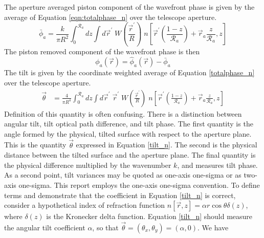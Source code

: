 The aperture averaged piston component of the wavefront phase is given by the average of
Equation \ref{eqn:totalphase_n} over the telescope aperture.
\begin{equation}\label{eqn:pistonphase_n}
\bar{\phi}_{a} = \frac{k}{\pi R^{2}} \int_{0}^{\mathcal{R}_{a}} dz 
\int d\vec{r}^{\prime} \; 
W \left( \frac{\vec{r}^{\prime}}{R} \right) \;
n
\left[\vec{r}^{\prime} \left( \frac{1-z}{\mathcal{R}_{a}} \right) + 
\vec{r}_{a} \frac{z}{\mathcal{R}_{a}}, z \right]
\end{equation}
The piston removed component of the wavefront phase is then
\begin{equation}\label{prphase_n}
\phi_{a}\left(\vec{r}\right) = \hat{\phi}_{a}\left(\vec{r}\right) - \bar{\phi}_{a}
\end{equation}
The tilt is given by the coordinate weighted average of Equation
\ref{totalphase_n} over the telescope aperture.
\begin{equation}\label{tilt_n}
\begin{aligned}
\vec{\theta} &= \frac{4}{\pi R^{4}} \int_{0}^{\mathcal{R}_{a}} dz 
\int d\vec{r}^{\prime} \; \vec{r}^{\prime} \;
W \left( \frac{\vec{r}^{\prime}}{R} \right) \;
n
\left[ \vec{r}^{\prime} \left(\frac{1-z}{\mathcal{R}_{a}}\right) + 
\vec{r}_{a} \frac{z}{\mathcal{R}_{a}}, z\right]
\end{aligned}
\end{equation}
Definition of this quantity is often confusing.  There is a
distinction between angular tilt, tilt optical path difference, and
tilt phase.  The first quantity is the angle formed by the physical,
tilted surface with respect to the aperture plane.  This is the
quantity $\vec{\theta}$ expressed in Equation \ref{tilt_n}.
The second is the physical distance between the tilted surface and the
aperture plane.  The final quantity is the physical difference
multiplied by the wavenumber $k$, and measures tilt phase.  As a
second point, tilt variances may be quoted as one-axis one-sigma or as
two-axis one-sigma.  
This report employs the one-axis one-sigma
convention.  To define terms and demonstrate that the coefficient in
Equation \ref{tilt_n} is correct, consider a hypothetical index of
refraction function $n\left[\vec{r},z\right] = \alpha r \cos
\theta \delta\left(z\right)$, where $\delta\left(z\right)$ is the
Kronecker delta function.  Equation \ref{tilt_n} should measure the
angular tilt coefficient $\alpha$, so that $\vec{\theta} =
\left(\theta_{x}, \theta_{y}\right) = \left(\alpha, 0\right)$.  We
have
